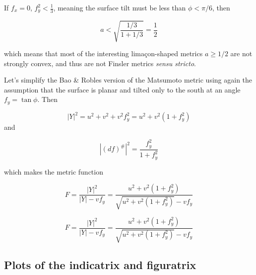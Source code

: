 \documentclass[11pt]{article}
\begin{document}
If \(f_x=0\), \(f_y^2<\tfrac{1}{3}\), meaning the surface tilt must be
less than \(\phi < \pi/6\), then

\begin{equation}
    a < \sqrt{\dfrac{1/3}{1+1/3}} = \dfrac{1}{2}
\end{equation}

which means that most of the interesting limaçon-shaped metrics
\(a\geq 1/2\) are not strongly convex, and thus are not Finsler metrics
\emph{sensu stricto}.

    Let's simplify the Bao \& Robles version of the Matsumoto metric using
again the assumption that the surface is planar and tilted only to the
south at an angle \(f_y = \tan\phi\). Then

\begin{equation}
    |Y|^2 = u^2 + v^2 + v^2 f_y^2 = u^2 + v^2 (1+f_y^2) 
\end{equation} and

\begin{equation}
    |(df)^\#|^2 = \dfrac{f_y^2}{1+f_y^2}
\end{equation}

which makes the metric function

\begin{equation}
    F = \dfrac{|Y|^2}{|Y|-v f_y} = \dfrac{u^2 + v^2 (1+f_y^2) }{\sqrt{u^2 + v^2 (1+f_y^2)}-v f_y}
\end{equation}

    \begin{equation}
    F = \dfrac{|Y|^2}{|Y|-v f_y} = \dfrac{u^2 + v^2 (1+f_y^2) }{\sqrt{u^2 + v^2 (1+f_y^2)}-v f_y}
\end{equation}

    \hypertarget{plots-of-the-indicatrix-and-figuratrix}{%
\subsection*{Plots of the indicatrix and
figuratrix}\label{plots-of-the-indicatrix-and-figuratrix}}





    \begin{center}
    \end{center}
    { \hspace*{\fill} \\}
    

    \begin{center}
    \end{center}
    { \hspace*{\fill} \\}
    
\end{document}
